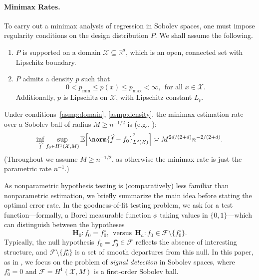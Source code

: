 \documentclass[twoside]{article}
\newcommand{\Reals}{\mathbb{R}}
\newcommand{\1}{\mathbf{1}}
\newcommand{\Rd}{\Reals^d}
\newcommand{\Xset}{\mathcal{X}}
\newcommand{\mc}[1]{\mathcal{#1}}
\newcommand{\Ebb}{\mathbb{E}}
\newcommand{\wh}[1]{\widehat{#1}}
\theoremstyle{definition}
\theoremstyle{remark}
\begin{document}
\paragraph{Minimax Rates.}

To carry out a minimax analysis of regression in Sobolev spaces, one must impose regularity conditions on the design distribution $P$. We shall assume the following.
\begin{enumerate}[label=(P\arabic*)]
	\item
	\label{asmp:domain}
	$P$ is supported on a domain $\Xset \subseteq \Rd$, which is an open, connected set with Lipschitz boundary.
	\item
	\label{asmp:density} 
	$P$ admits a density $p$ such that
	\begin{equation*}
	0 < p_{\min} \leq p(x) \leq p_{\max} < \infty, ~~\textrm{for all $x \in \Xset$}.
	\end{equation*}
	Additionally, $p$ is Lipschitz on $\Xset$, with Lipschitz constant $L_p$.
\end{enumerate}

Under conditions~\ref{asmp:domain}, \ref{asmp:density}, the minimax estimation rate over a Sobolev ball of radius $M \geq n^{-1/2}$ is (e.g., \citet{tsybakov2008_book}):
\begin{equation}
\label{eqn:sobolev_space_estimation_minimax_rate}
\inf_{\wh{f}} \sup_{f_0 \in H^1(\Xset, M)} \Ebb\Bigl[\norm{\wh{f} - f_0}_{L^2(\Xset)}^2\Bigr] \asymp M^{2d/(2 + d)} n^{-2/(2 + d)}.
\end{equation}
(Throughout we assume $M \geq n^{-1/2}$, as otherwise the minimax rate is just the parametric rate $n^{-1}$.)

As nonparametric hypothesis testing is (comparatively) less familiar than nonparametric estimation, we briefly summarize the main idea before stating the optimal error rate. In the goodness-of-fit testing problem, we ask for a test function---formally, a Borel measurable function $\phi$ taking values in $\{0,1\}$---which can distinguish between the hypotheses
\begin{equation}
\mathbf{H}_0: f_0 = f_0^{\star}, ~~\textrm{versus}~~ \mathbf{H}_a: f_0 \in \mc{F} \setminus \{f_0^{\star}\}.
\end{equation} 
Typically, the null hypothesis $f_0 = f_0^{\star} \in \mc{F}$ reflects the absence of interesting structure, and $\mc{F} \setminus  \{f_0^{\star}\}$ is a set of smooth departures from this null. In this paper, as in \citet{ingster2009}, we focus on the problem of \emph{signal detection} in Sobolev spaces, where $f_0^{\star} = 0$ and $\mc{F} = H^1(\Xset,M)$ is a first-order Sobolev ball. 
\end{document}
